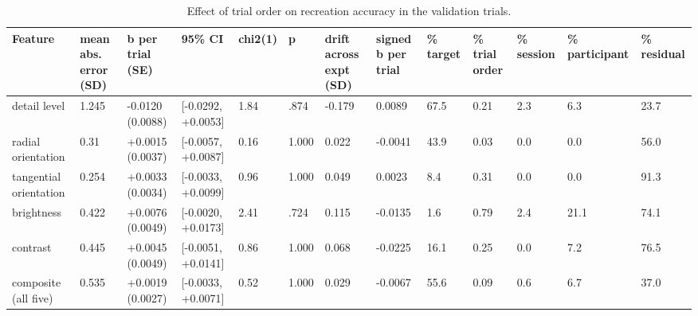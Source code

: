 \begin{table}[htbp]
\centering
\small
\caption{Effect of trial order on recreation accuracy in the validation trials.}
\label{tab:S5.3}
\begin{tabular}{lllllllllllll}
\hline
Feature & mean abs. error (SD) & b per trial (SE) & 95\% CI & chi2(1) & p & drift across expt (SD) & signed b per trial & \% target & \% trial order & \% session & \% participant & \% residual \\
\hline
detail level & 1.245 & -0.0120 (0.0088) & [-0.0292, +0.0053] & 1.84 & .874 & -0.179 & 0.0089 & 67.5 & 0.21 & 2.3 & 6.3 & 23.7 \\
radial orientation & 0.31 & +0.0015 (0.0037) & [-0.0057, +0.0087] & 0.16 & 1.000 & 0.022 & -0.0041 & 43.9 & 0.03 & 0.0 & 0.0 & 56.0 \\
tangential orientation & 0.254 & +0.0033 (0.0034) & [-0.0033, +0.0099] & 0.96 & 1.000 & 0.049 & 0.0023 & 8.4 & 0.31 & 0.0 & 0.0 & 91.3 \\
brightness & 0.422 & +0.0076 (0.0049) & [-0.0020, +0.0173] & 2.41 & .724 & 0.115 & -0.0135 & 1.6 & 0.79 & 2.4 & 21.1 & 74.1 \\
contrast & 0.445 & +0.0045 (0.0049) & [-0.0051, +0.0141] & 0.86 & 1.000 & 0.068 & -0.0225 & 16.1 & 0.25 & 0.0 & 7.2 & 76.5 \\
composite (all five) & 0.535 & +0.0019 (0.0027) & [-0.0033, +0.0071] & 0.52 & 1.000 & 0.029 & -0.0067 & 55.6 & 0.09 & 0.6 & 6.7 & 37.0 \\
\hline
\end{tabular}
\end{table}